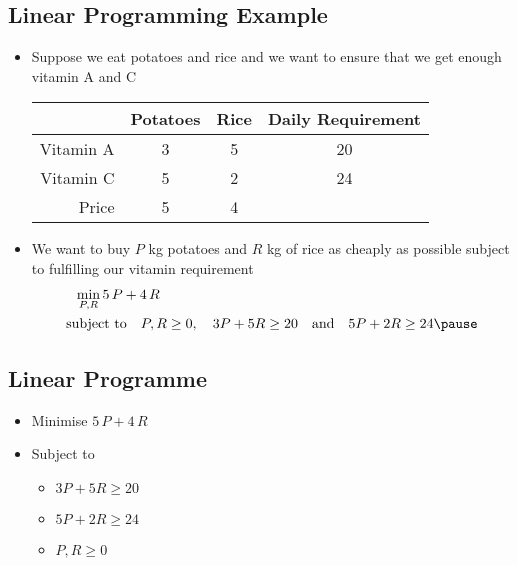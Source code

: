 \begin{slide}
\section{Linear Programming Example}

\begin{PauseHighLight}
  \begin{itemize}
  \item Suppose we eat potatoes and rice and we want to ensure that we
    get enough vitamin A and C\pause
    \begin{center}
      \begin{tabular}{|r|c|c|c|}\hline
     &Potatoes& Rice& Daily Requirement \\ \hline
        Vitamin A & 3 & 5 & 20 \\ \hline
        Vitamin C & 5 & 2 & 24 \\ \hline
        Price & 5 & 4 & \\ \hline
      \end{tabular}\pause
    \end{center}
  \item We want to buy $P$ kg potatoes and $R$ kg of rice as cheaply as
    possible subject to fulfilling our vitamin requirement\pause
    \begin{align*}
      \min_{P,R} 5\,P + 4\,R\hspace{8cm} \\
      \text{subject to} \quad P,R\geq0, \quad 3 P + 5 R \geq 20 \quad \text{and} \quad
      5 P + 2 R \geq 24\pause
    \end{align*}
  \end{itemize}
\end{PauseHighLight}

\end{slide}


\begin{slide}
\section{Linear Programme}

\pb
\begin{minipage}{0.4\linewidth}
    \begin{itemize}
    \item Minimise $5\,P + 4\,R$
    \item Subject to
      \begin{itemize}
      \item $3 P + 5 R \geq 20$
      \item $5 P + 2 R \geq 24$
      \item $P, R \geq 0$\pause
      \end{itemize}
    \end{itemize}
\end{minipage}\hfill
\begin{minipage}{0.55\linewidth}
  \pause
\end{minipage}
\end{slide}

